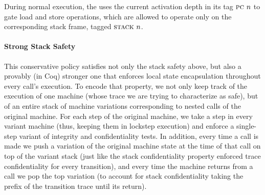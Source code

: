 \documentclass[acmsmall,review,anonymous]{acmart}\settopmatter{printfolios=true,printccs=false,printacmref=false}
\begin{document}

During normal execution, the {\PCname} uses the current activation
depth in its tag $\textsc{pc} ~ n$ to gate load and store operations,
which are allowed to operate only on the corresponding stack frame,
tagged $\textsc{stack} ~ n$.      



\paragraph*{Strong Stack Safety}


This conservative policy satisfies not only the stack safety above,
but also a provably (in Coq) stronger one that enforces local state
encapsulation throughout every call's execution. To encode that
property, we not only keep track of the execution of one machine
(whose trace we are trying to characterize as safe), but of an entire
stack of machine variations corresponding to nested calls of the
original machine. For each step of the original machine, we take a
step in every variant machine (thus, keeping them in lockstep
execution) and enforce a single-step variant of integrity and
confidentiality tests. In addition, every time a call is made we push
a variation of the original machine state at the time of that call on
top of the variant stack (just like the stack confidentiality property
enforced trace confidentiality for every transition), and every time
the machine returns from a call we pop the top variation (to account
for stack confidentiality taking the prefix of the transition trace
until its return).
\end{document}
